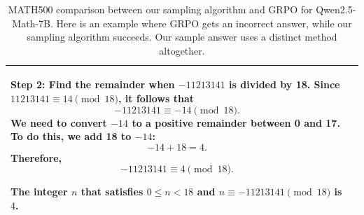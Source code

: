 \documentclass{article}
\begin{document}
\begin{table}[h!]
\begin{tabular}{Q{1.1cm} Z{\answercol}}
{Step 2: Find the remainder when \(-11213141\) is divided by 18.  
Since \( 11213141 \equiv 14 \pmod{18} \), it follows that
\[
-11213141 \equiv -14 \pmod{18}.
\]
We need to convert \(-14\) to a positive remainder between 0 and 17. To do this, we add 18 to \(-14\):
\[
-14 + 18 = 4.
\]
Therefore,
\[
-11213141 \equiv 4 \pmod{18}.
\]

The integer \( n \) that satisfies \( 0 \le n < 18 \) and \( n \equiv -11213141 \pmod{18} \) is
\(\boxed{4}\).
} \\
\bottomrule
\end{tabular}
\caption{MATH500 comparison between our sampling algorithm and GRPO for Qwen2.5-Math-7B. Here is an example where GRPO gets an incorrect answer, while our sampling algorithm succeeds. Our sample answer uses a distinct method altogether.}
\end{table}
















\end{document}
